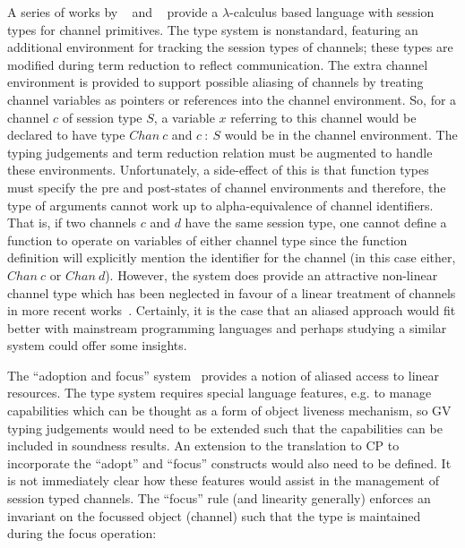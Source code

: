 \documentclass{mpaper}
\begin{document}
A series of works by \citeauthor{Gay:2003:STI}~\cite{Gay:2003:STI} and
\citeauthor{Vasconcelos:2006:TCM}~\cite{Vasconcelos:2006:TCM} provide a
$\lambda$-calculus based language with session types for channel
primitives. The type system is nonstandard, featuring an additional
environment for tracking the session types of channels; these types are
modified during term reduction to reflect communication. The extra channel
environment is provided to support possible aliasing of channels by treating
channel variables as pointers or references into the channel environment. So,
for a channel $c$ of session type $S$, a variable $x$ referring to this
channel would be declared to have type $Chan~c$ and $c~:~S$ would be in the
channel environment. The typing judgements and term reduction relation must be
augmented to handle these environments. Unfortunately, a side-effect of this
is that function types must specify the pre and post-states of channel
environments and therefore, the type of arguments cannot work up to
alpha-equivalence of channel identifiers. That is, if two channels $c$ and $d$
have the same session type, one cannot define a function to operate on
variables of either channel type since the function definition will explicitly
mention the identifier for the channel (in this case either, $Chan~c$ or
$Chan~d$). However, the system does provide an attractive non-linear channel
type which has been neglected in favour of a linear treatment of channels in
more recent
works~\cite{Gay:2010:LAST,Mazurak:2010:LCC,Wadler:2014}. Certainly, it is the
case that an aliased approach would fit better with mainstream programming
languages and perhaps studying a similar system could offer some insights.

The ``adoption and focus'' system~\cite{Fahndrich:2002} provides a notion of
aliased access to linear resources. The type system requires special language
features, e.g. to manage capabilities which can be thought as a form of object
liveness mechanism, so GV typing judgements would need to be extended such
that the capabilities can be included in soundness results. An extension to
the translation to CP to incorporate the ``adopt'' and ``focus'' constructs
would also need to be defined. It is not immediately clear how these features
would assist in the management of session typed channels. The ``focus'' rule
(and linearity generally) enforces an invariant on the focussed object
(channel) such that the type is maintained during the focus operation:

\end{document}
